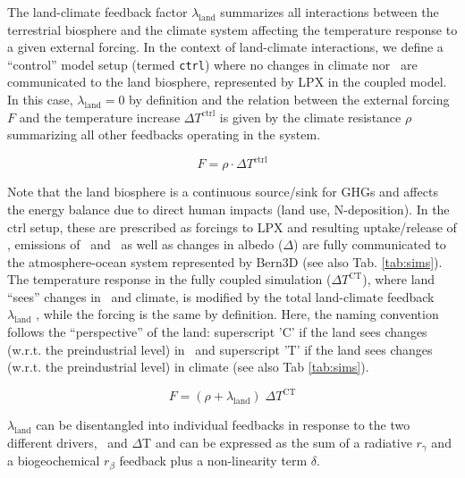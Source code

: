 \documentclass{myreport}
\begin{document}
The land-climate feedback factor $\lambda_\text{land}$ summarizes all interactions between the terrestrial biosphere and the climate system affecting the temperature response to a given external forcing. In the context of land-climate interactions, we define a ``control'' model setup (termed {\tt ctrl}) where no changes in climate nor \coo\ are communicated to the land biosphere, represented by LPX in the coupled model. In this case, $\lambda_\text{land}=0$ by definition and the relation between the external forcing $F$ and the temperature increase $\Delta T^{\text{ctrl}}$ is given by the climate resistance $\rho$ summarizing all other feedbacks operating in the system.

\begin{equation}
F = \rho \cdot \Delta T^{\text{ctrl}} %
\end{equation}

Note that the land biosphere is a continuous source/sink for GHGs and affects the energy balance due to direct human impacts (land use, N-deposition). In the ctrl setup, these are prescribed as forcings to LPX and resulting uptake/release of \coo , emissions of \chh\ and \nno\ as well as changes in albedo ($\Delta$\albedo) are fully communicated to the atmosphere-ocean system represented by Bern3D (see also Tab. \ref{tab:sims}).\\

The temperature response in the fully coupled simulation ($\Delta T^{\text{CT}}$), where land ``sees'' changes in \coo\ and climate, is modified by the total land-climate feedback $\lambda_{\text{land}}$ , while the forcing is the same by definition. Here, the naming convention follows the ``perspective'' of the land: superscript 'C' if the land sees changes (w.r.t. the preindustrial level) in \coo\ and superscript 'T' if the land sees changes (w.r.t. the preindustrial level) in climate (see also Tab \ref{tab:sims}). 

\begin{equation}
F = (\rho + \lambda_\text{land})\; \Delta T^{\text{CT}} %
\label{eq:CT}
\end{equation}

$\lambda_{\text{land}}$ can be disentangled into individual feedbacks in response to the two different drivers, \coo\ and $\Delta$T and can be expressed as the sum of a radiative $r_\gamma$ and a biogeochemical $r_\beta$ feedback plus a non-linearity term $\delta$.
\end{document}
